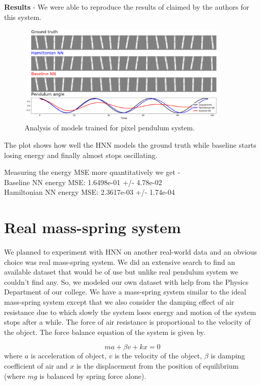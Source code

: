 \textbf{Results} - We were able to reproduce the results of claimed by the authors for this system.
\begin{figure}[htp]
    \centering
    \includegraphics[width=10cm]{../openreview/pixel.png}
    \caption{Analysis of models trained for pixel pendulum system.}
    \label{fig:galaxy}
\end{figure}

The plot shows how well the HNN models the ground truth while baseline starts losing energy and finally almost stops oscillating.

Measuring the energy MSE more quantitatively we get -\\
Baseline NN energy MSE: 1.6498e-01 +/- 4.78e-02\\
Hamiltonian NN energy MSE: 2.3617e-03 +/- 1.74e-04


\section{Real mass-spring system}
We planned to experiment with HNN on another real-world data and an obvious choice was real mass-spring system. We did an extensive search to find an available dataset that would be of use but unlike real pendulum system we couldn't find any. So, we modeled our own dataset with help from the Physics Department of our college. We have a mass-spring system similar to the ideal mass-spring system except that we also consider the damping effect of air resistance due to which slowly the system loses energy and motion of the system stops after a while. The force of air resistance is proportional to the velocity of the object. The force balance equation of the system is given by.

\begin{equation}
    ma + \beta v + kx = 0
\end{equation}
where \(a\) is acceleration of object, \(v\) is the velocity of the object, \(\beta\) is damping coefficient of air and \(x\) is the displacement from the position of equilibrium (where \(mg\) is balanced by spring force alone).

